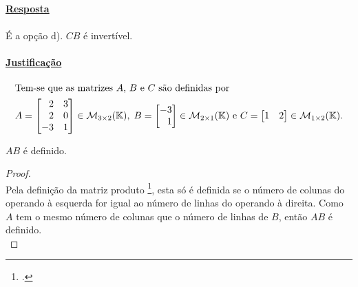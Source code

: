 \grupo{}

\exercicio{}

\paragraph{\underline{Resposta}}

\paragraph{}É a opção d). $CB$ é invertível.

\paragraph{\underline{Justificação}}

\begin{align*}
	\intertext{Tem-se que as matrizes $A$, $B$ e $C$ são definidas por}
	A =
	\begin{bmatrix*}[r]
		2  & 3\\
		2  & 0\\
		-3 & 1
	\end{bmatrix*}
	\in
	\mathcal{M}_{3 \times 2}(\mathbb{K})
	,\;
	B =
	\begin{bmatrix*}[r]
		-3\\
		1
	\end{bmatrix*}
	\in
	\mathcal{M}_{2 \times 1}(\mathbb{K})
	 \text{ e }
	C =
	\begin{bmatrix*}[r]
		1  & 2
	\end{bmatrix*}
	\in
	\mathcal{M}_{1 \times 2}(\mathbb{K})
	.
\end{align*}

\vspace{0.25cm}

\begin{proposition}\label{prop:i-1-a}
	$AB$ é definido.
\end{proposition}

\vspace{0.25cm}

\begin{proof}
	\; \\
	Pela definição da matriz produto
	\footcite[pág. 12, Definição 1.18: matriz produto]{Cabral2012},
	esta só é definida se o número de colunas do
	operando à esquerda for igual ao número de linhas do operando à
	direita. Como
	$A$ tem o mesmo número de colunas que o número de linhas de $B$,
	então $AB$ é definido.\\
\end{proof}

